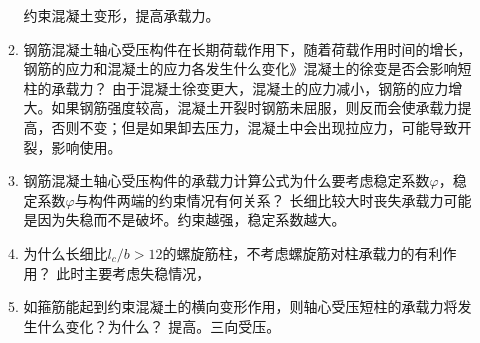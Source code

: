 \documentclass{article}
\begin{document}
\begin{enumerate}
\begin{enumerate}[1.]
                        \ans 约束混凝土变形，提高承载力。
                  \item 钢筋混凝土轴心受压构件在长期荷载作用下，随着荷载作用时间的增长，钢筋的应力和混凝土的应力各发生什么变化》混凝土的徐变是否会影响短柱的承载力？
                        \ans 由于混凝土徐变更大，混凝土的应力减小，钢筋的应力增大。如果钢筋强度较高，混凝土开裂时钢筋未屈服，则反而会使承载力提高，否则不变；但是如果卸去压力，混凝土中会出现拉应力，可能导致开裂，影响使用。
                  \item 钢筋混凝土轴心受压构件的承载力计算公式为什么要考虑稳定系数$\varphi$，稳定系数$\varphi$与构件两端的约束情况有何关系？
                        \ans 长细比较大时丧失承载力可能是因为失稳而不是破坏。约束越强，稳定系数越大。
                  \item 为什么长细比$l_c/b>12$的螺旋筋柱，不考虑螺旋筋对柱承载力的有利作用？
                        \ans 此时主要考虑失稳情况，
                  \item 如箍筋能起到约束混凝土的横向变形作用，则轴心受压短柱的承载力将发生什么变化？为什么？
                        \ans 提高。三向受压。
            \end{enumerate}
\end{enumerate}
\end{document}

